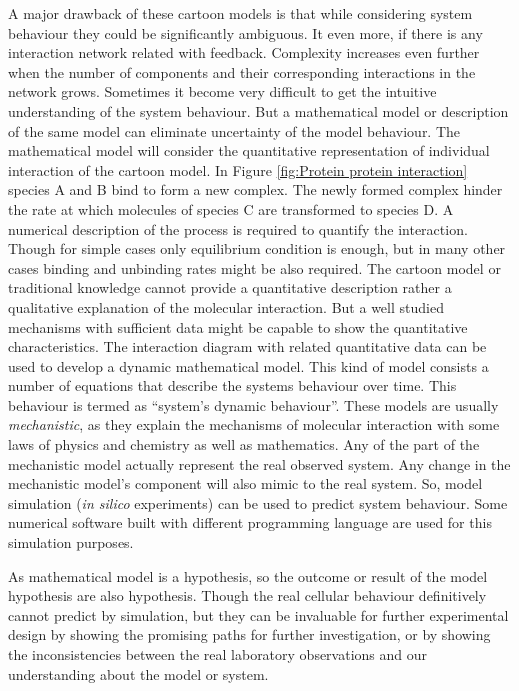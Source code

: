A major drawback of these cartoon models is that while considering system behaviour they could be significantly ambiguous. It even more, if there is any interaction network related with feedback. Complexity increases even further when the number of components and their corresponding interactions in the network grows. Sometimes it become very difficult to get the intuitive understanding of the system behaviour. But a mathematical model or description of the same model can eliminate uncertainty of the model behaviour. The mathematical model will consider the quantitative representation of individual interaction of the cartoon model. In Figure \ref{fig:Protein protein interaction} species A and B bind to form a new complex. The newly formed complex hinder the rate at which molecules of species C are transformed to species D. A numerical description of the process is required to quantify the interaction. Though for simple cases only equilibrium condition is enough, but in many other cases binding and unbinding rates might be also required. The cartoon model or traditional knowledge cannot provide a quantitative description rather a qualitative explanation of the molecular interaction. But a well studied mechanisms with sufficient data might be capable to show the quantitative characteristics. The interaction diagram with related quantitative data can be used to develop a dynamic mathematical model. This kind of model consists a number of equations that describe the systems behaviour over time. This behaviour is termed as ``system's dynamic behaviour''. These models are usually \textit{mechanistic}, as they explain the mechanisms of molecular interaction with some laws of physics and chemistry as well as mathematics. Any of the part of the mechanistic model actually represent the real observed system. Any change in the mechanistic model's component will also mimic to the real system. So, model simulation (\textit{in silico} experiments) can be used to predict system behaviour. Some numerical software built with different programming language are used for this simulation purposes. 

As mathematical model is a hypothesis, so the outcome or result of the model hypothesis are also hypothesis. Though the real cellular behaviour definitively cannot predict by simulation, but they can be invaluable for further experimental design by showing the promising paths for further investigation, or by showing the inconsistencies between the real laboratory observations and our understanding about the model or system. 

